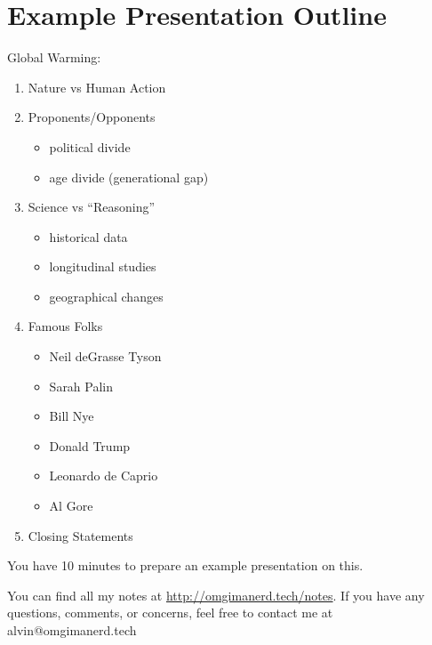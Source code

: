 \documentclass[letterpaper, 12pt]{article}
\begin{document}
\section*{Example Presentation Outline}
Global Warming:
\begin{enumerate}
  \item Nature vs Human Action
  \item Proponents/Opponents
    \begin{itemize}
      \item political divide
      \item age divide (generational gap)
    \end{itemize}
  \item Science vs ``Reasoning''
    \begin{itemize}
      \item historical data
      \item longitudinal studies
      \item geographical changes
    \end{itemize}
  \item Famous Folks
    \begin{itemize}
      \item Neil deGrasse Tyson
      \item Sarah Palin
      \item Bill Nye
      \item Donald Trump
      \item Leonardo de Caprio
      \item Al Gore
    \end{itemize}
  \item Closing Statements
\end{enumerate}
You have 10 minutes to prepare an example presentation on this.

\begin{center}
  You can find all my notes at \url{http://omgimanerd.tech/notes}. If you have
  any questions, comments, or concerns, feel free to contact me at
  alvin@omgimanerd.tech
\end{center}
\end{document}
